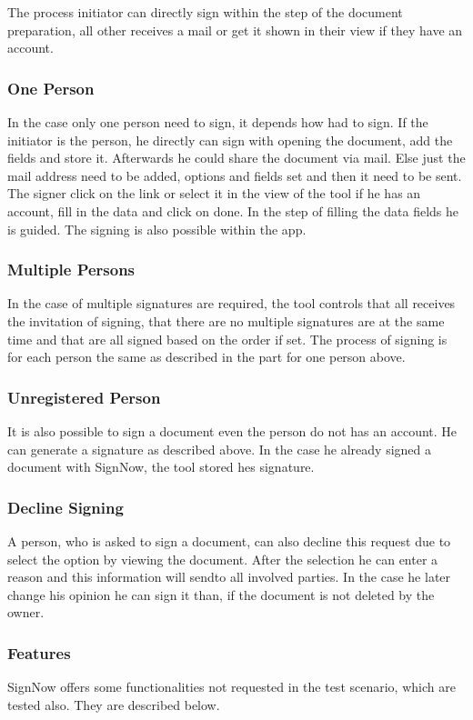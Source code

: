 The process initiator can directly sign within the step of the document preparation, all other receives a mail or get it shown in their view if they have an account.
\subsubsection{One Person}
In the case only one person need to sign, it depends how had to sign. If the initiator is the person, he directly can sign with opening the document, add the fields and store it. Afterwards he could share the document via mail. Else just the mail address need to be added, options and fields set and then it need to be sent. The signer click on the link or select it in the view of the tool if he has an account, fill in the data and click on done. In the step of filling the data fields he is guided. The signing is also possible within the \gls{app}.

\subsubsection{Multiple Persons}
In the case of multiple signatures are required, the tool controls that all receives the invitation of signing, that there are no multiple signatures are at the same time and that are all signed based on the order if set. The process of signing is for each person the same as described in the part for one person above. 

\subsubsection{Unregistered Person}
It is also possible to sign a document even the person do not has an account. He can generate a signature as described above. In the case he already signed a document with SignNow, the tool stored hes signature. 

\subsubsection{Decline Signing}
A person, who is asked to sign a document, can also decline this request due to select the option by viewing the document. After the selection he can enter a reason and this information will sendto all involved parties. In  the case he later change his opinion he can sign it than, if the document is not deleted by the owner.

\subsubsection{Features}
SignNow offers some functionalities not requested in the test scenario, which are tested also. They are described below.

